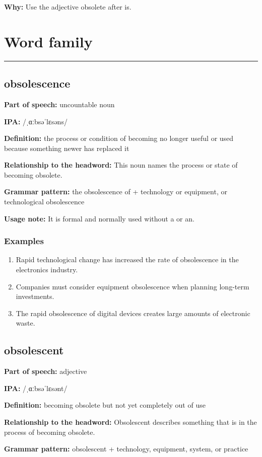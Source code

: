 \documentclass[11pt]{article}
\newcommand{\sectionrule}{\par\vspace{-0.5em}\noindent\textcolor{Accent}{\rule{\linewidth}{0.6pt}}\par}
\begin{document}
\textbf{Why:} Use the adjective obsolete after is.

\section{Word family}
\sectionrule
\subsection{obsolescence}
\textbf{Part of speech:} uncountable noun

\textbf{IPA:} /ˌɑːbsəˈlɛsəns/

\textbf{Definition:} the process or condition of becoming no longer useful or used because something newer has replaced it

\textbf{Relationship to the headword:} This noun names the process or state of becoming obsolete.

\textbf{Grammar pattern:} the obsolescence of + technology or equipment, or technological obsolescence

\textbf{Usage note:} It is formal and normally used without a or an.

\subsubsection{Examples}
\begin{enumerate}
  \item Rapid technological change has increased the rate of obsolescence in the electronics industry.
  \item Companies must consider equipment obsolescence when planning long-term investments.
  \item The rapid obsolescence of digital devices creates large amounts of electronic waste.
\end{enumerate}

\subsection{obsolescent}
\textbf{Part of speech:} adjective

\textbf{IPA:} /ˌɑːbsəˈlɛsənt/

\textbf{Definition:} becoming obsolete but not yet completely out of use

\textbf{Relationship to the headword:} Obsolescent describes something that is in the process of becoming obsolete.

\textbf{Grammar pattern:} obsolescent + technology, equipment, system, or practice
\end{document}
